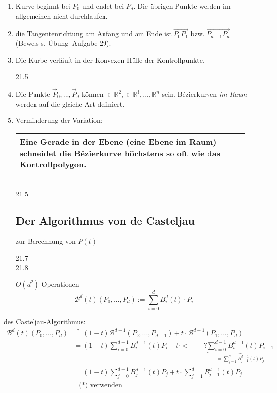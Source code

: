 \begin{enumerate}
 \item Kurve beginnt bei $P_0$ und endet bei $P_d$. Die übrigen Punkte werden im allgemeinen nicht durchlaufen.
 \item die Tangentenrichtung am Anfang und am Ende ist $\overrightarrow{P_0P_1}$ bzw.
	$\overrightarrow{P_{d-1}P_d}$ (Beweis s. Übung, Aufgabe 29).
 \item Die Kurbe verläuft in der Konvexen Hülle der Kontrollpunkte.
	\begin{center}
	 21.5
	\end{center}
 \item Die Punkte $\vec P_0, ..., \vec P_d$ können $\in \mathbb{R}^2, \in \mathbb{R}^3, ..., \mathbb{R}^n$ sein.
	Bézierkurven \emph{im Raum} werden auf die gleiche Art definiert.
 \item Verminderung der Variation:
	\begin{center}
	 \begin{tabular}{|p{0.97\linewidth}|}
	  \hline
	  Eine Gerade in der Ebene (eine Ebene im Raum) schneidet die Bézierkurve höchstens so oft wie das
	  Kontrollpolygon.\\
	  \hline
	 \end{tabular}\\
	 21.5
	\end{center}
\subsection{Der Algorithmus von de Casteljau}
zur Berechnung von $P(t)$
\begin{center}
 21.7\\
 21.8
\end{center}
$O(d^2)$ Operationen
\[\mathcal B^d(t)(P_0,...,P_d) := \sum\limits_{i=0}^d B_i^d(t) \cdot P_i\]
\end{enumerate}
\Bew des Casteljau-Algorithmus:
\begin{align*}
 \mathcal B^d(t)(P_0,...,P_d) &\stackrel{?}= (1-t) \mathcal B^{d-1}(P_0, ..., P_{d-1})
	+ t \cdot \mathcal B^{d-1}(P_1, ..., P_d)\\
	&= (1-t) \sum\limits_{i=0}^{d-1} B_i^{d-1}(t) P_i + t \cdot <-- ?
		 \underbrace{\sum\limits_{i=0}^{d-1} B_i^{d-1}(t) P_{i+1}}_
			{=\sum\limits_{j=1}^{d} B_{j-1}^{d-1}(t) P_j}\\
	&= (1-t) \sum\limits_{j=0}^{d-1} B_j^{d-1}(t) P_{j} + t \cdot \sum\limits_{j=1}^{d} B_{j-1}^{d-1}(t) P_j\\
	&= \text{(*) verwenden}
\end{align*}
